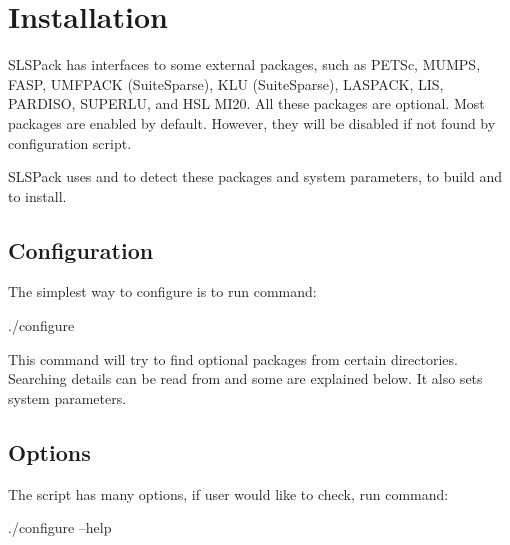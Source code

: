 
\chapter{Installation}

SLSPack has interfaces to some external packages, such as PETSc, MUMPS, FASP, 
UMFPACK (SuiteSparse), KLU (SuiteSparse), LASPACK, LIS, 
PARDISO, SUPERLU, and HSL MI20. All these packages are optional. 
Most packages are enabled by default. However, they will be disabled if not found by configuration
script.

SLSPack uses {\color{blue}{\verb|autoconf|}} and {\color{blue}{\verb|make|}} 
to detect these packages and system parameters,
to build and to install.

\section{Configuration}
The simplest way to configure is to run command:
\begin{evb}
./configure
\end{evb}

This command will try to find optional packages from certain directories. Searching details can be read
from {\color{blue}{configure.in}} and some are explained below. It also sets system parameters.

\section{Options}
The script {\color{blue}{configure}} has many options, if user would like to check, 
run command:
\begin{evb}
./configure --help
\end{evb}


